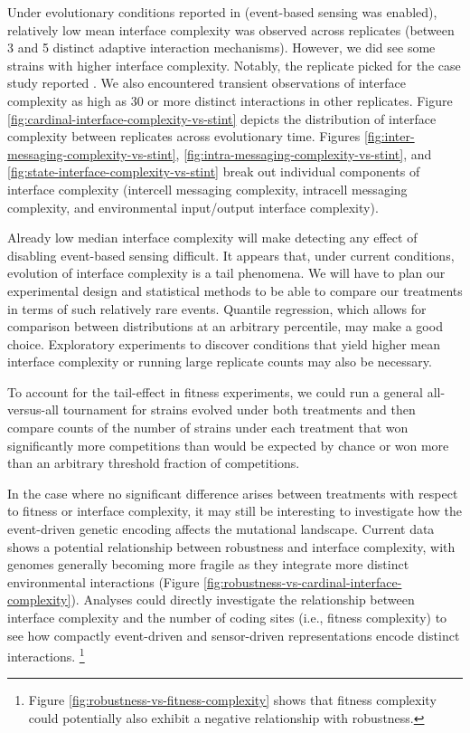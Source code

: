 Under evolutionary conditions reported in \citep{moreno2021case} (event-based sensing was enabled), relatively low mean interface complexity was observed across replicates (between 3 and 5 distinct adaptive interaction mechanisms).
However, we did see some strains with higher interface complexity.
Notably, the replicate picked for the case study reported \citep{moreno2021case} .
We also encountered transient observations of interface complexity as high as 30 or more distinct interactions in other replicates.
Figure \ref{fig:cardinal-interface-complexity-vs-stint} depicts the distribution of interface complexity between replicates across evolutionary time.
Figures \ref{fig:inter-messaging-complexity-vs-stint}, \ref{fig:intra-messaging-complexity-vs-stint}, and \ref{fig:state-interface-complexity-vs-stint} break out individual components of interface complexity (intercell messaging complexity, intracell messaging complexity, and environmental input/output interface complexity).

Already low median interface complexity will make detecting any effect of disabling event-based sensing difficult.
It appears that, under current conditions, evolution of interface complexity is a tail phenomena.
We will have to plan our experimental design and statistical methods to be able to compare our treatments in terms of such relatively rare events.
Quantile regression, which allows for comparison between distributions at an arbitrary percentile, may make a good choice.
Exploratory experiments to discover conditions that yield higher mean interface complexity or running large replicate counts may also be necessary.

To account for the tail-effect in fitness experiments, we could run a general all-versus-all tournament for strains evolved under both treatments and then compare counts of the number of strains under each treatment that won significantly more competitions than would be expected by chance or won more than an arbitrary threshold fraction of competitions.




In the case where no significant difference arises between treatments with respect to fitness or interface complexity, it may still be interesting to investigate how the event-driven genetic encoding affects the mutational landscape.
Current data shows a potential relationship between robustness and interface complexity, with genomes generally becoming more fragile as they integrate more distinct environmental interactions (Figure \ref{fig:robustness-vs-cardinal-interface-complexity}).
Analyses could directly investigate the relationship between interface complexity and the number of coding sites (i.e., fitness complexity) to see how compactly event-driven and sensor-driven representations encode distinct interactions.%
\footnote{%
Figure \ref{fig:robustness-vs-fitness-complexity} shows that fitness complexity could potentially also exhibit a negative relationship with robustness.
}

